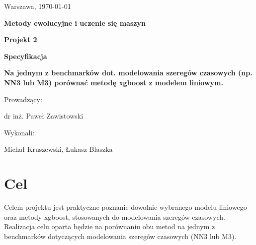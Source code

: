 \documentclass[11pt]{report}
\begin{document}
\thispagestyle{empty}

\begin{flushright}
\large{Warszawa, \today}
\end{flushright}

\vspace{5 cm}

\begin{center}
\LARGE{\textbf{Metody ewolucyjne i uczenie się maszyn}}

\vspace{5 mm}

\Large{\textbf{Projekt 2}}

\Large{\textbf{Specyfikacja}}

\vspace{5 mm}

\Large{\textbf{Na jednym z benchmarków dot. modelowania szeregów czasowych (np. NN3 lub M3) porównać metodę xgboost z modelem liniowym.}}
\end{center}

\vspace{3 cm}

\begin{flushright}
\large{Prowadzący:}

\large{dr inż. Paweł Zawistowski}
\end{flushright}

\vspace{1 cm}

\begin{flushright}
\large{Wykonali:}

\large{Michał Kruszewski, Łukasz Blaszka}
\end{flushright}

\newpage

\tableofcontents
\newpage

\section{Cel}
Celem projektu jest praktyczne poznanie dowolnie wybranego modelu liniowego oraz metody xgboost, stosowanych do modelowania szeregów czasowych.
Realizacja celu oparta będzie na porównaniu obu metod na jednym z benchmarków dotyczących modelowania szeregów czasowych (NN3 lub M3).
\end{document}
